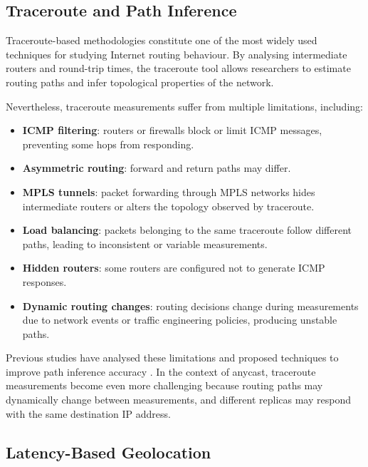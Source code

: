 \documentclass[
A4paper,                %
twoside,                %
openright,              %
chapterprefix=true,     %
12pt,                   %
headings=normal,        %
titlepage=on            %
]{book}
\begin{document}
\subsection{Traceroute and Path Inference}
\label{sc:background_location_measurements_pathing}

Traceroute-based methodologies constitute one of the most widely used techniques for studying Internet routing behaviour. By analysing intermediate routers and round-trip times, the traceroute tool allows researchers to estimate routing paths and infer topological properties of the network.

Nevertheless, traceroute measurements suffer from multiple limitations, including:

\begin{itemize}
    \item \textbf{ICMP filtering}: routers or firewalls block or limit ICMP messages, preventing some hops from responding.
    \item \textbf{Asymmetric routing}: forward and return paths may differ.    
    \item \textbf{MPLS tunnels}: packet forwarding through MPLS networks hides intermediate routers or alters the topology observed by traceroute.
    \item \textbf{Load balancing}: packets belonging to the same traceroute follow different paths, leading to inconsistent or variable measurements.
    \item \textbf{Hidden routers}: some routers are configured not to generate ICMP responses.
    \item \textbf{Dynamic routing changes}: routing decisions change during measurements due to network events or traffic engineering policies, producing unstable paths.
\end{itemize}

Previous studies have analysed these limitations and proposed techniques to improve path inference accuracy \cite{Dainotti2012IssuesClassification}. In the context of anycast, traceroute measurements become even more challenging because routing paths may dynamically change between measurements, and different replicas may respond with the same destination IP address.

\subsection{Latency-Based Geolocation}
\label{sc:background_location_measurements_latency_geolocation}
\end{document}
